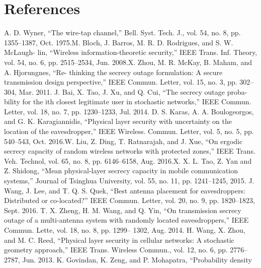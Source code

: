 \documentclass{article}
\begin{document}
\section{References}
\newline
[1] A. D. Wyner, “The wire-tap channel,” Bell. Syst. Tech. J.,
vol. 54, no. 8, pp. 1355–1387, Oct. 1975.\newline
[2] M. Bloch, J. Barros, M. R. D. Rodrigues, and S. W. McLaugh-
lin, “Wireless information-theoretic security,” IEEE Trans. Inf.
Theory, vol. 54, no. 6, pp. 2515–2534, Jun. 2008.\newline
[3] X. Zhou, M. R. McKay, B. Maham, and A. Hjorungnes, “Re-
thinking the secrecy outage formulation: A secure transmission
design perspective,” IEEE Commun. Letter, vol. 15, no. 3, pp.
302–304, Mar. 2011. \newline
[4] J. Bai, X. Tao, J. Xu, and Q. Cui, “The secrecy outage proba-
bility for the ith closest legitimate user in stochastic networks,”
IEEE Commun. Letter, vol. 18, no. 7, pp. 1230–1233, Jul. 2014. \newline
[5] D. S. Karas, A. A. Boulogeorgos, and G. K. Karagiannidis,
“Physical layer security with uncertainty on the location of the
eavesdropper,” IEEE Wireless. Commun. Letter, vol. 5, no. 5,
pp. 540–543, Oct. 2016.\newline
[6] W. Liu, Z. Ding, T. Ratnarajah, and J. Xue, “On ergodic secrecy
capacity of random wireless networks with protected zones,”
IEEE Trans. Veh. Technol, vol. 65, no. 8, pp. 6146–6158, Aug.
2016.\newline
[7] X. X. L. Tao, Z. Yan and Z. Shidong, “Mean physical-layer
secrecy capacity in mobile communication systems,” Journal of
Tsinghua University, vol. 55, no. 11, pp. 1241–1245, 2015. \newline
[8] J. Wang, J. Lee, and T. Q. S. Quek, “Best antenna placement
for eavesdroppers: Distributed or co-located?” IEEE Commun.
Letter, vol. 20, no. 9, pp. 1820–1823, Sept. 2016. \newline
[9] T. X. Zheng, H. M. Wang, and Q. Yin, “On transmission
secrecy outage of a multi-antenna system with randomly located
eavesdroppers,” IEEE Commun. Lette, vol. 18, no. 8, pp. 1299–
1302, Aug. 2014. \newline
[10] H. Wang, X. Zhou, and M. C. Reed, “Physical layer security
in cellular networks: A stochastic geometry approach,” IEEE
Trans. Wireless Commun., vol. 12, no. 6, pp. 2776–2787, Jun.
2013. \newline
[11] K. Govindan, K. Zeng, and P. Mohapatra, “Probability density
\end{document}
